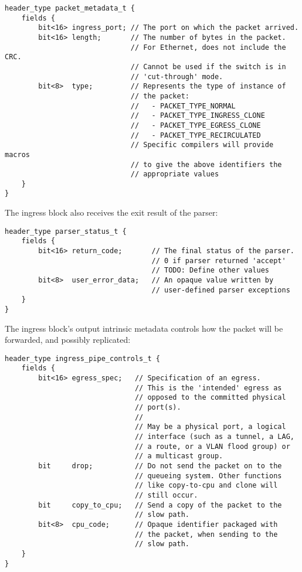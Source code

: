 \documentclass[12pt]{article}
\begin{document}
\begin{lstlisting}[style=P4style]
header_type packet_metadata_t {
    fields {
        bit<16> ingress_port; // The port on which the packet arrived.
        bit<16> length;       // The number of bytes in the packet. 
                              // For Ethernet, does not include the CRC. 
                              // Cannot be used if the switch is in
                              // 'cut-through' mode.
        bit<8>  type;         // Represents the type of instance of
                              // the packet: 
                              //   - PACKET_TYPE_NORMAL
                              //   - PACKET_TYPE_INGRESS_CLONE
                              //   - PACKET_TYPE_EGRESS_CLONE
                              //   - PACKET_TYPE_RECIRCULATED
                              // Specific compilers will provide macros
                              // to give the above identifiers the
                              // appropriate values
    }
}
\end{lstlisting}

The ingress block also receives the exit result of the parser: 

\begin{lstlisting}[style=P4style]
header_type parser_status_t {
    fields {
        bit<16> return_code;       // The final status of the parser.
                                   // 0 if parser returned 'accept'
                                   // TODO: Define other values 
        bit<8>  user_error_data;   // An opaque value written by
                                   // user-defined parser exceptions
    }
}
\end{lstlisting}

The ingress block's output intrinsic metadata controls how the packet will be
forwarded, and possibly replicated:

\begin{lstlisting}[style=P4style]
header_type ingress_pipe_controls_t {
    fields {
        bit<16> egress_spec;   // Specification of an egress.
                               // This is the 'intended' egress as
                               // opposed to the committed physical
                               // port(s).
                               //
                               // May be a physical port, a logical
                               // interface (such as a tunnel, a LAG,
                               // a route, or a VLAN flood group) or
                               // a multicast group.
        bit     drop;          // Do not send the packet on to the
                               // queueing system. Other functions
                               // like copy-to-cpu and clone will
                               // still occur.
        bit     copy_to_cpu;   // Send a copy of the packet to the
                               // slow path.
        bit<8>  cpu_code;      // Opaque identifier packaged with
                               // the packet, when sending to the
                               // slow path.
    }
}
\end{lstlisting}
\end{document}

